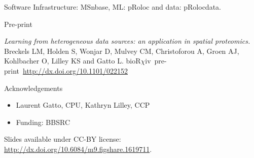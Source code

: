 \documentclass[bigger]{beamer}
\newcommand{\Rpackage}[1]{{\mbox{\normalfont\textsf{#1}}}}
\begin{document}
  \begin{frame}

   \begin{block}{Software}
     \vspace{.1cm}
    Infrastructure: \Rpackage{MSnbase}, ML: \Rpackage{pRoloc} and data: \Rpackage{pRolocdata}.
    \vspace{.2cm}
  \end{block}
   
  \begin{block}{Pre-print}
  \begin{small}
    \textit{Learning from heterogeneous data sources: an application
      in spatial proteomics.} Breckels LM, Holden S, Wonjar D, Mulvey
    CM, Christoforou A, Groen AJ, Kohlbacher O, Lilley KS and Gatto L.
    bioR$\chi$iv~pre-print~\url{http://dx.doi.org/10.1101/022152}
    \vspace{.2cm}
    \end{small}
  \end{block}
  
  \begin{block}{Acknowledgements}
    \begin{itemize}
    \item Laurent Gatto, CPU, Kathryn Lilley, CCP
    \item Funding: BBSRC
    \end{itemize}
  \end{block}
  
  \footnotesize{Slides available under CC-BY license:
    \url{http://dx.doi.org/10.6084/m9.figshare.1619711}.}
  
  \end{frame}
\end{document}
